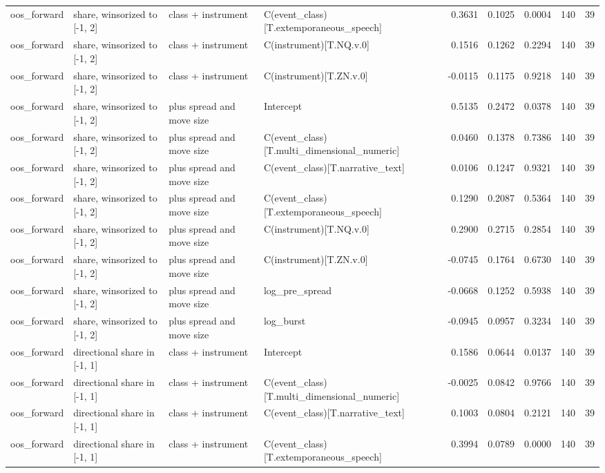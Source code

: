 \begin{tabular}{llllrrrrr}
oos_forward & share, winsorized to [-1, 2] & class + instrument & C(event_class)[T.extemporaneous_speech] & 0.3631 & 0.1025 & 0.0004 & 140 & 39 \\
oos_forward & share, winsorized to [-1, 2] & class + instrument & C(instrument)[T.NQ.v.0] & 0.1516 & 0.1262 & 0.2294 & 140 & 39 \\
oos_forward & share, winsorized to [-1, 2] & class + instrument & C(instrument)[T.ZN.v.0] & -0.0115 & 0.1175 & 0.9218 & 140 & 39 \\
oos_forward & share, winsorized to [-1, 2] & plus spread and move size & Intercept & 0.5135 & 0.2472 & 0.0378 & 140 & 39 \\
oos_forward & share, winsorized to [-1, 2] & plus spread and move size & C(event_class)[T.multi_dimensional_numeric] & 0.0460 & 0.1378 & 0.7386 & 140 & 39 \\
oos_forward & share, winsorized to [-1, 2] & plus spread and move size & C(event_class)[T.narrative_text] & 0.0106 & 0.1247 & 0.9321 & 140 & 39 \\
oos_forward & share, winsorized to [-1, 2] & plus spread and move size & C(event_class)[T.extemporaneous_speech] & 0.1290 & 0.2087 & 0.5364 & 140 & 39 \\
oos_forward & share, winsorized to [-1, 2] & plus spread and move size & C(instrument)[T.NQ.v.0] & 0.2900 & 0.2715 & 0.2854 & 140 & 39 \\
oos_forward & share, winsorized to [-1, 2] & plus spread and move size & C(instrument)[T.ZN.v.0] & -0.0745 & 0.1764 & 0.6730 & 140 & 39 \\
oos_forward & share, winsorized to [-1, 2] & plus spread and move size & log_pre_spread & -0.0668 & 0.1252 & 0.5938 & 140 & 39 \\
oos_forward & share, winsorized to [-1, 2] & plus spread and move size & log_burst & -0.0945 & 0.0957 & 0.3234 & 140 & 39 \\
oos_forward & directional share in [-1, 1] & class + instrument & Intercept & 0.1586 & 0.0644 & 0.0137 & 140 & 39 \\
oos_forward & directional share in [-1, 1] & class + instrument & C(event_class)[T.multi_dimensional_numeric] & -0.0025 & 0.0842 & 0.9766 & 140 & 39 \\
oos_forward & directional share in [-1, 1] & class + instrument & C(event_class)[T.narrative_text] & 0.1003 & 0.0804 & 0.2121 & 140 & 39 \\
oos_forward & directional share in [-1, 1] & class + instrument & C(event_class)[T.extemporaneous_speech] & 0.3994 & 0.0789 & 0.0000 & 140 & 39 \\

\end{tabular}
